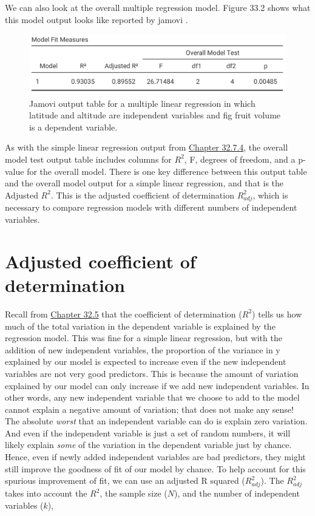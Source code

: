 \documentclass[
  openany]{krantz}
\begin{document}
We can also look at the overall multiple regression model.
Figure 33.2 shows what this model output looks like reported by jamovi \citep{Jamovi2022}.

\begin{figure}
\includegraphics[width=1\linewidth]{img/jamovi_overall_multiple_regression_output} \caption{Jamovi output table for a multiple linear regression in which latitude and altitude are independent variables and fig fruit volume is a dependent variable.}\label{fig:unnamed-chunk-152}
\end{figure}

As with the simple linear regression output from \protect\hyperlink{simple-regression-output}{Chapter 32.7.4}, the overall model test output table includes columns for \(R^{2}\), F, degrees of freedom, and a p-value for the overall model.
There is one key difference between this output table and the overall model output for a simple linear regression, and that is the Adjusted \(R^{2}\).
This is the adjusted coefficient of determination \(R^{2}_{adj}\), which is necessary to compare regression models with different numbers of independent variables.

\hypertarget{adjusted-coefficient-of-determination}{%
\section{Adjusted coefficient of determination}\label{adjusted-coefficient-of-determination}}

Recall from \protect\hyperlink{coefficient-of-determination}{Chapter 32.5} that the coefficient of determination (\(R^{2}\)) tells us how much of the total variation in the dependent variable is explained by the regression model.
This was fine for a simple linear regression, but with the addition of new independent variables, the proportion of the variance in y explained by our model is expected to increase even if the new independent variables are not very good predictors.
This is because the amount of variation explained by our model can only increase if we add new independent variables.
In other words, any new independent variable that we choose to add to the model cannot explain a negative amount of variation; that does not make any sense!
The absolute \emph{worst} that an independent variable can do is explain zero variation.
And even if the independent variable is just a set of random numbers, it will likely explain \emph{some} of the variation in the dependent variable just by chance.
Hence, even if newly added independent variables are bad predictors, they might still improve the goodness of fit of our model by chance.
To help account for this spurious improvement of fit, we can use an adjusted R squared (\(R^{2}_{adj}\)).
The \(R^{2}_{adj}\) takes into account the \(R^{2}\), the sample size (\(N\)), and the number of independent variables (\(k\)),
\end{document}
